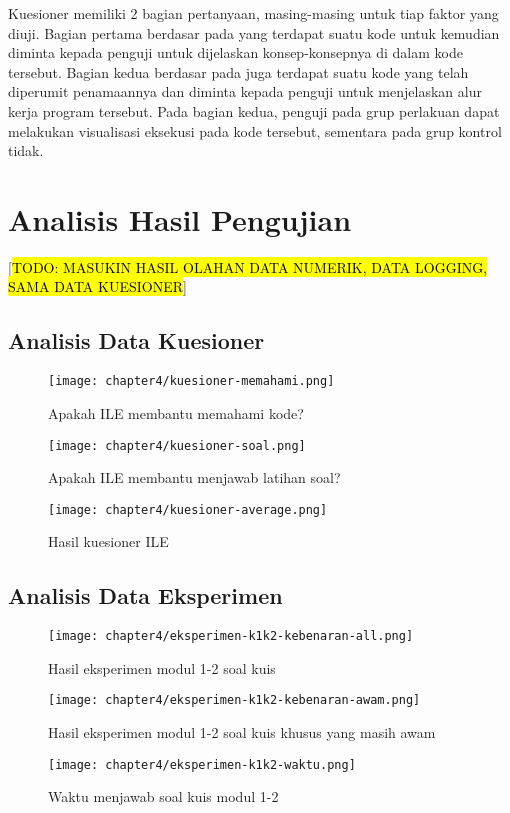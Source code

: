 Kuesioner memiliki 2 bagian pertanyaan, masing-masing untuk tiap faktor yang diuji. Bagian pertama berdasar pada \textcite{mayer1981psychology} yang terdapat suatu kode untuk kemudian diminta kepada penguji untuk dijelaskan konsep-konsepnya di dalam kode tersebut. Bagian kedua berdasar pada \textcite{moons2013pilot} juga terdapat suatu kode yang telah diperumit penamaannya dan diminta kepada penguji untuk menjelaskan alur kerja program tersebut. Pada bagian kedua, penguji pada grup perlakuan dapat melakukan visualisasi eksekusi pada kode tersebut, sementara pada grup kontrol tidak.


\section{Analisis Hasil Pengujian}
 [\hl{TODO: MASUKIN HASIL OLAHAN DATA NUMERIK, DATA LOGGING, SAMA DATA KUESIONER}]

\subsection{Analisis Data Kuesioner}
\begin{figure}[H]
  \centering
  \texttt{[image: chapter4/kuesioner-memahami.png]}
  \caption{Apakah ILE membantu memahami kode?} \label{fig:kuesioner-memahami}
\end{figure}
\blindtext

\begin{figure}[H]
  \centering
  \texttt{[image: chapter4/kuesioner-soal.png]}
  \caption{Apakah ILE membantu menjawab latihan soal?} \label{fig:kuesioner-soal}
\end{figure}
\blindtext

\begin{figure}[H]
  \centering
  \texttt{[image: chapter4/kuesioner-average.png]}
  \caption{Hasil kuesioner ILE} \label{fig:kuesioner-average}
\end{figure}
\blindtext

\subsection{Analisis Data Eksperimen}
\begin{figure}[H]
  \centering
  \texttt{[image: chapter4/eksperimen-k1k2-kebenaran-all.png]}
  \caption{Hasil eksperimen modul 1-2 soal kuis} \label{fig:eksperimen-k1k2-kebenaran-all}
\end{figure}
\begin{figure}[H]
  \centering
  \texttt{[image: chapter4/eksperimen-k1k2-kebenaran-awam.png]}
  \caption{Hasil eksperimen modul 1-2 soal kuis khusus yang masih awam} \label{fig:eksperimen-k1k2-kebenaran-awam}
\end{figure}
\blindtext
\begin{figure}[H]
  \centering
  \texttt{[image: chapter4/eksperimen-k1k2-waktu.png]}
  \caption{Waktu menjawab soal kuis modul 1-2} \label{fig:eksperimen-k1k2-waktu}
\end{figure}
\blindtext

